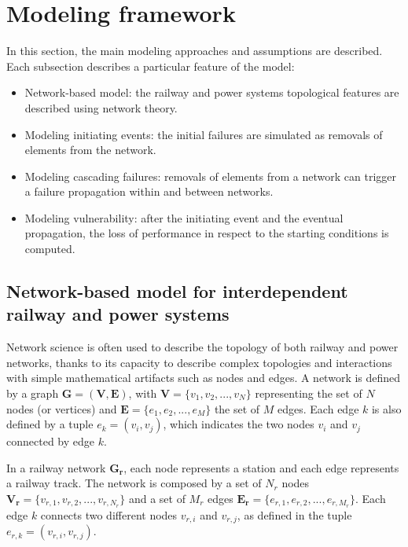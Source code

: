\documentclass[review]{elsarticle}
\begin{document}
	\section{Modeling framework}
	In this section, the main modeling approaches and assumptions are described. Each subsection describes a particular feature of the model: 
	\begin{itemize}
	    \item Network-based model: the railway and power systems topological features are described using network theory.
	    \item Modeling initiating events: the initial failures are simulated as removals of elements from the network.
	    \item Modeling cascading failures: removals of elements from a network can trigger a failure propagation within and between networks.
	    \item Modeling vulnerability: after the initiating event and the eventual propagation, the loss of performance in respect to the starting conditions is computed.
	\end{itemize}
	

	
	
	\subsection{Network-based model for interdependent railway and power systems}
	
	Network science is often used to describe the topology of both railway and power networks, thanks to its capacity to describe complex topologies and interactions with simple mathematical artifacts such as nodes and edges. A network is defined by a graph $\mathbf{G}=(\mathbf{V}, \mathbf{E})$, with $\mathbf{V} = \{ v_1, v_2,...,v_N \}$ representing the set of $N$ nodes (or vertices) and $\mathbf{E} = \{ e_1, e_2,...,e_M \}$ the set of $M$ edges. Each edge $k$ is also defined by a tuple $e_k=(v_i,v_j)$, which indicates the two nodes $v_i$ and $v_j$ connected by edge $k$.
	
	In a railway network $\mathbf{G_r}$, each node represents a station and each edge represents a railway track. The network is composed by a set of $N_r$ nodes $\mathbf{V_r}=\{ v_{r,1}, v_{r,2},...,v_{r,N_r} \}$ and a set of $M_r$ edges $\mathbf{E_r}=\{ e_{r,1}, e_{r,2},...,e_{r,M_r} \}$. Each edge $k$ connects two different nodes $v_{r,i}$ and $v_{r,j}$, as defined in the tuple $e_{r,k} = (v_{r,i}, v_{r,j})$.
	
\end{document}
